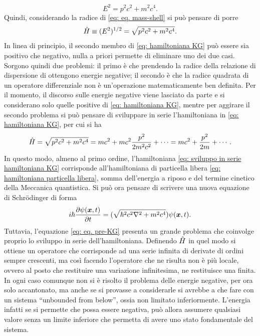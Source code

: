 \begin{equation}
\label{eq: eq. mass-shell}
    E^2=p^2c^2+m^2c^4.
\end{equation}
Quindi, considerando la radice di \eqref{eq: eq. mass-shell} si può pensare di porre
\begin{equation}
\label{eq: hamiltoniana KG}
    \hat{H}\equiv (E^2)^{1/2} = \sqrt{p^2c^2+m^2c^4}.
\end{equation}
In linea di principio, il secondo membro di \eqref{eq: hamiltoniana KG} può essere sia positivo che negativo, nulla a priori permette di eliminare uno dei due casi. Sorgono quindi due problemi: il primo è che prendendo la radice della relazione di dispersione di ottengono energie negative; il secondo è che la radice quadrata di un operatore differenziale non è un'operazione matematicamente ben definita. Per il momento, il discorso sulle energie negative viene lasciato da parte e si considerano solo quelle positive di \eqref{eq: hamiltoniana KG}, mentre per aggirare il secondo problema si può pensare di sviluppare in serie l'hamiltoniana in \eqref{eq: hamiltoniana KG}, per cui si ha
\begin{equation}
\label{eq: sviluppo in serie hamiltoniana KG}
    \hat{H} = \sqrt{p^2c^2+m^2c^4} = mc^2 + mc^2\frac{p^2}{2m^2c^2} + \cdots = mc^2 + \frac{p^2}{2m} + \cdots.
\end{equation}
In questo modo, almeno al primo ordine, l'hamiltoniana \eqref{eq: sviluppo in serie hamiltoniana KG} corrisponde all'hamiltoniana di particella libera \eqref{eq: hamiltoniana particella libera}, somma dell'energia a riposo e del termine cinetico della Meccanica quantistica. Si può ora pensare di scrivere una nuova equazione di Schr\"odinger di forma
\begin{equation}
\label{eq: eq. pre-KG}
    i\hbar\frac{\partial\psi(\bm{x},t)}{\partial t} = (\sqrt{\hbar^2c^2\nabla^2 + m^2c^4})\psi(\bm{x},t).
\end{equation}
Tuttavia, l'equazione \eqref{eq: eq. pre-KG} presenta un grande problema che coinvolge proprio lo sviluppo in serie dell'hamiltoniana. Definendo $\hat{H}$ in quel modo si ottiene un operatore che corrisponde ad una serie infinita di derivate di ordini sempre crescenti, ma così facendo l'operatore che ne risulta non è più locale, ovvero al posto che restituire una variazione infinitesima, ne restituisce una finita. In ogni caso comunque non si è risolto il problema delle energie negative, per ora solo accantonato, ma anche se si provasse a considerarle si avrebbe a che fare con un sistema ``unbounded from below'', ossia non limitato inferiormente. L'energia infatti se si permette che possa essere negativa, può allora assumere qualsiasi valore senza un limite inferiore che permetta di avere uno stato fondamentale del sistema. 

